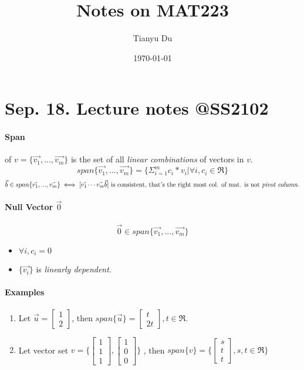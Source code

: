 \documentclass{article}
\author{Tianyu Du}
\date{\today}
\title{Notes on MAT223}
\begin{document}
	\maketitle
	\doclicenseThis
	\tableofcontents
	\section{Sep. 18. Lecture notes @SS2102}
	\paragraph{Span} of $v=\{\vec{v_1},...,\vec{v_m}\}$ is the set of all \emph{linear combinations} of vectors in $v$.
		\[
		span\{\vec{v_1},...,\vec{v_m}\} = \{\Sigma_{i=1}^m c_i * v_i \vert \forall i, c_i \in \Re\}
		\]
		\[
		\vec{b} \in span\{\vec{v_1},...,\vec{v_m}\} \iff [\vec{v_1}\cdots\vec{v_m}\vec{b}] \text{ is consistent, that's the right most col. of mat. is not \emph{pivot column.}}
		\]
	\paragraph{Null Vector $\vec{0}$}
		\[
		\vec{0} \in span\{\vec{v_1},...,\vec{v_m}\}
		\]
		\begin{itemize}
			\item $\forall i, c_i = 0$
			\item $\{\vec{v_i}\}$ is \emph{linearly dependent}.
		\end{itemize}
	\paragraph{Examples}
	\begin{enumerate}
		\item Let $\vec{u}=\begin{bmatrix} 1\\2 \end{bmatrix}$, then  $span\{\vec{u}\}=\begin{bmatrix} t \\ 2t \end{bmatrix}, t \in \Re$.
		\item Let vector set $v = \{ \begin{bmatrix} 1\\1\\1 \end{bmatrix}, \begin{bmatrix} 1\\0\\0 \end{bmatrix} \}$
			, then $span\{v\} = \{\begin{bmatrix} s\\t\\t \end{bmatrix}, s,t \in \Re \}$
	\end{enumerate}
\end{document}
